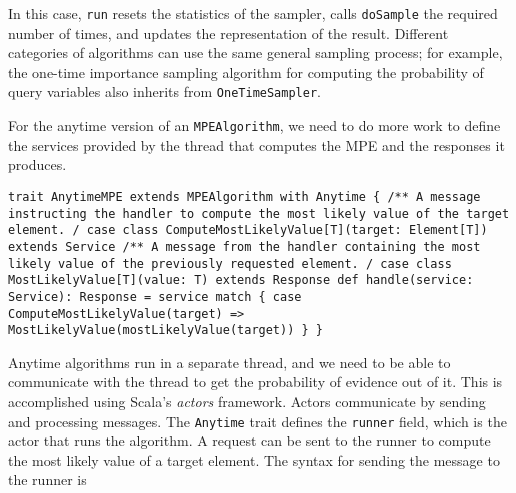 In this case, \texttt{run} resets the statistics of the sampler, calls \texttt{doSample} the required number of times, and updates the representation of the result. Different categories of algorithms can use the same general sampling process; for example, the one-time importance sampling algorithm for computing the probability of query variables also inherits from \texttt{OneTimeSampler}.

For the anytime version of an \texttt{MPEAlgorithm}, we need to do more work to define the services provided by the thread that computes the MPE and the responses it produces.

\begin{flushleft}
\texttt{trait AnytimeMPE extends MPEAlgorithm with Anytime \{
\newline \tab /**
\newline \tab * A message instructing the handler to compute the most likely
value of the target element.
\newline \tab */
\newline \tab case class ComputeMostLikelyValue[T](target: Element[T]) extends
Service
\newline 
\newline \tab /**
\newline \tab * A message from the handler containing the most likely value of the previously requested element.
\newline \tab */
\newline 
\newline \tab case class MostLikelyValue[T](value: T) extends Response
\newline 
\newline \tab def handle(service: Service): Response =
\newline \tab service match \{
\newline \tab case ComputeMostLikelyValue(target) =>
\newline \tab MostLikelyValue(mostLikelyValue(target))
\newline \}
\newline \}
}
\end{flushleft}

Anytime algorithms run in a separate thread, and we need to be able to communicate with the thread to get the probability of evidence out of it. This is accomplished using Scala's \emph{actors} framework.  Actors communicate by sending and processing messages. The \texttt{Anytime} trait defines the \texttt{runner} field, which is the actor that runs the algorithm. A request can be sent to the runner to compute the most likely value of a target element. The syntax for sending the message to the runner is

